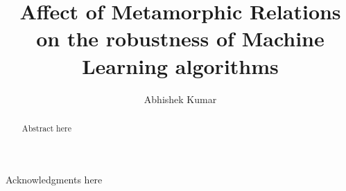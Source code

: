 \documentclass[print,ms]{unothesis}
\begin{document}
\title{Affect of Metamorphic Relations on the robustness of Machine Learning algorithms}
\author{Abhishek Kumar}
\memberc{\ } %

\maketitle

\begin{abstract}
 Abstract here
\end{abstract}

\frontmatter



\begin{acknowledgments}
 Acknowledgments here
\end{acknowledgments}


\setlength{\beforechapskip}{-40pt} %
\renewcommand*\contentsname{Table of Contents}
\tableofcontents  %
\listoffigures
\listoftables
\end{document}
